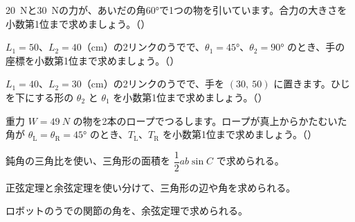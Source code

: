 \bkproblem \qty{20}{N}と\qty{30}{N}の力が、あいだの角\ang{60}で1つの物を引いています。合力の大きさを小数第1位まで求めましょう。\mbox{（）}


\bkproblem $L_1=50$、$L_2=40$（cm）の2リンクのうでで、$\theta_1=\ang{45}$、$\theta_2=\ang{90}$ のとき、手の座標を小数第1位まで求めましょう。\mbox{（）}

\bkproblem $L_1=40$、$L_2=30$（cm）の2リンクのうでで、手を $(30,\ 50)$ に置きます。ひじを下にする形の $\theta_2$ と $\theta_1$ を小数第1位まで求めましょう。\mbox{（）}

\bkproblem 重力 $W=\qty{49}{N}$ の物を2本のロープでつるします。ロープが真上からかたむいた角が $\theta_{\mathrm{L}}=\theta_{\mathrm{R}}=\ang{45}$ のとき、$T_{\mathrm{L}}$、$T_{\mathrm{R}}$ を小数第1位まで求めましょう。\mbox{（）}

\begin{furikaeri}
\begin{checklist}
\item 鈍角の三角比を使い、三角形の面積を $\dfrac{1}{2}ab\sin C$ で求められる。
\item 正弦定理と余弦定理を使い分けて、三角形の辺や角を求められる。
\item ロボットのうでの関節の角を、余弦定理で求められる。
\end{checklist}
\end{furikaeri}

